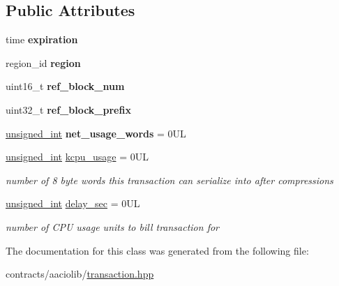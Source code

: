 \subsection*{Public Attributes}
\begin{DoxyCompactItemize}
\item 
\mbox{\label{classaacio_1_1transaction__header_a941dd8619e8049cec7f7e74e0397efa9}} 
time {\bfseries expiration}
\item 
\mbox{\label{classaacio_1_1transaction__header_aa6ab1157aaef264d09dd01a0f63b19ad}} 
region\+\_\+id {\bfseries region}
\item 
\mbox{\label{classaacio_1_1transaction__header_a710e5fa8a54ee112191d497edf3b43a3}} 
uint16\+\_\+t {\bfseries ref\+\_\+block\+\_\+num}
\item 
\mbox{\label{classaacio_1_1transaction__header_a9836d8b595b53e27e70107c1339fc10e}} 
uint32\+\_\+t {\bfseries ref\+\_\+block\+\_\+prefix}
\item 
\mbox{\label{classaacio_1_1transaction__header_a9c521875eb563b20ba9a5bd0d65365ca}} 
\mbox{\hyperlink{structfc_1_1unsigned__int}{unsigned\+\_\+int}} {\bfseries net\+\_\+usage\+\_\+words} = 0\+UL
\item 
\mbox{\label{classaacio_1_1transaction__header_a81c25e48e8313725e1a856ceb70afd12}} 
\mbox{\hyperlink{structfc_1_1unsigned__int}{unsigned\+\_\+int}} \mbox{\hyperlink{classaacio_1_1transaction__header_a81c25e48e8313725e1a856ceb70afd12}{kcpu\+\_\+usage}} = 0\+UL
\begin{DoxyCompactList}\small\item\em number of 8 byte words this transaction can serialize into after compressions \end{DoxyCompactList}\item 
\mbox{\label{classaacio_1_1transaction__header_a75caef62b4052989d7d1df5ad4d8fad0}} 
\mbox{\hyperlink{structfc_1_1unsigned__int}{unsigned\+\_\+int}} \mbox{\hyperlink{classaacio_1_1transaction__header_a75caef62b4052989d7d1df5ad4d8fad0}{delay\+\_\+sec}} = 0\+UL
\begin{DoxyCompactList}\small\item\em number of C\+PU usage units to bill transaction for \end{DoxyCompactList}\end{DoxyCompactItemize}


The documentation for this class was generated from the following file\+:\begin{DoxyCompactItemize}
\item 
contracts/aaciolib/\mbox{\hyperlink{contracts_2aaciolib_2transaction_8hpp}{transaction.\+hpp}}\end{DoxyCompactItemize}
